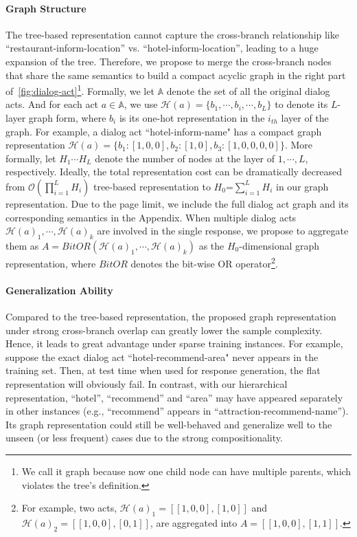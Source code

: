 \documentclass[11pt,a4paper]{article}
\begin{document}
\paragraph{Graph Structure}
The tree-based representation cannot capture the cross-branch relationship like ``restaurant-inform-location'' vs. ``hotel-inform-location'', leading to a huge expansion of the tree. Therefore, we propose to merge the cross-branch nodes that share the same semantics to build a compact acyclic graph in the right part of~\autoref{fig:dialog-act}\footnote{We call it graph because now one child node can have multiple parents, which violates the tree's definition.}. Formally, we let $\mathbb{A}$ denote the set of all the original dialog acts. And for each act $a\in \mathbb{A}$, we use $\mathcal{H}(a) = \{b_1, \cdots, b_i, \cdots, b_L\}$ to denote its $L$-layer graph form, where $b_i$ is its one-hot representation in the $i_{th}$ layer of the graph. For example, a dialog act ``hotel-inform-name" has a compact graph representation $\mathcal{H}(a) = \{b_1:[1,0,0], b_2:[1,0], b_3:[1,0,0,0,0]\}$. More formally, let $H_1 \cdots H_L$ denote the number of nodes at the layer of $1, \cdots, L$, respectively. Ideally, the total representation cost can be dramatically decreased from $\mathcal{O}(\prod_{i=1}^L H_i)$ tree-based representation to $H_0$=$\sum_{i=1}^L H_i$ in our graph representation. Due to the page limit, we include the full dialog act graph and its corresponding semantics in the Appendix. When multiple dialog acts $\mathcal{H}(a)_1, \cdots, \mathcal{H}(a)_k$ are involved in the single response, we propose to aggregate them as $A = BitOR(\mathcal{H}(a)_1, \cdots, \mathcal{H}(a)_k)$ as the $H_0$-dimensional graph representation, where $BitOR$ denotes the bit-wise OR operator\footnote{For example, two acts, $\mathcal{H}(a)_1=[[1,0,0],[1,0]]$ and $\mathcal{H}(a)_2=[[1,0,0],[0,1]]$, are aggregated into $A=[[1,0,0],[1,1]]$.}.

\paragraph{Generalization Ability}
Compared to the tree-based representation, the proposed graph representation under strong cross-branch overlap can greatly lower the sample complexity. Hence, it leads to great advantage under sparse training instances. For example, suppose the exact dialog act ``hotel-recommend-area" never appears in the training set. Then, at test time when used for response generation, the flat representation will obviously fail. In contrast, with our hierarchical representation, ``hotel'', ``recommend'' and ``area'' may have appeared separately in other instances (e.g., ``recommend'' appears in ``attraction-recommend-name''). Its graph representation could still be well-behaved and generalize well to the unseen (or less frequent) cases due to the strong compositionality.
\end{document}
